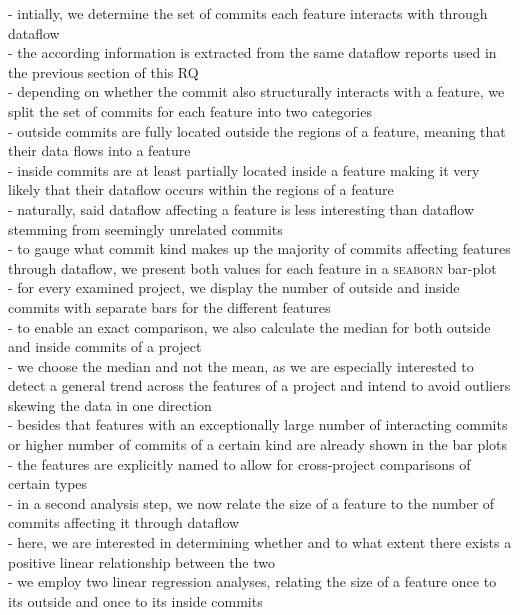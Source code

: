 - intially, we determine the set of commits each feature interacts with through dataflow \\
- the according information is extracted from the same dataflow reports used in the previous section of this RQ \\
- depending on whether the commit also structurally interacts with a feature, we split the set of commits for each feature into two categories \\
- outside commits are fully located outside the regions of a feature, meaning that their data flows into a feature \\
- inside commits are at least partially located inside a feature making it very likely that their dataflow occurs within the regions of a feature \\
- naturally, said dataflow affecting a feature is less interesting than dataflow stemming from seemingly unrelated commits \\
- to gauge what commit kind makes up the majority of commits affecting features through dataflow, we present both values for each feature in a \textsc{seaborn} bar-plot \\
- for every examined project, we display the number of outside and inside commits with separate bars for the different features \\
- to enable an exact comparison, we also calculate the median for both outside and inside commits of a project \\
- we choose the median and not the mean, as we are especially interested to detect a general trend across the features of a project and intend to avoid outliers skewing the data in one direction \\
- besides that features with an exceptionally large number of interacting commits or higher number of commits of a certain kind are already shown in the bar plots \\
- the features are explicitly named to allow for cross-project comparisons of certain types \\
- in a second analysis step, we now relate the size of a feature to the number of commits affecting it through dataflow \\
- here, we are interested in determining whether and to what extent there exists a positive linear relationship between the two \\
- we employ two linear regression analyses, relating the size of a feature once to its outside and once to its inside commits \\
